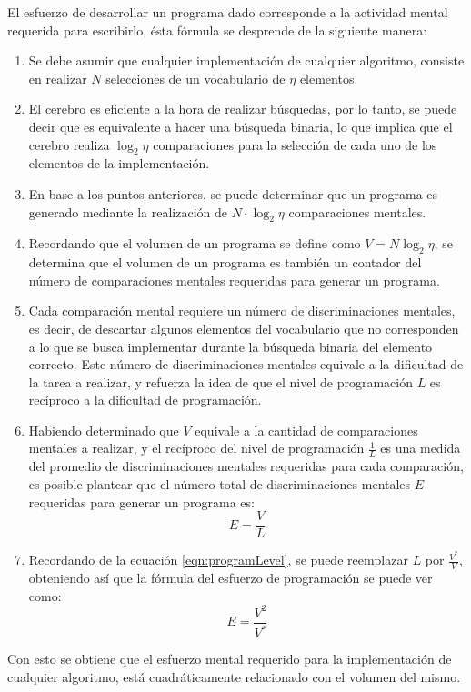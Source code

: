 \documentclass[letterpaper,12pt]{article}
\begin{document}
El esfuerzo de desarrollar un programa dado corresponde a la actividad mental requerida para escribirlo, ésta fórmula se desprende de la siguiente manera:

\begin{enumerate}
  \item Se debe asumir que cualquier implementación de cualquier algoritmo, consiste en realizar $N$ selecciones de un vocabulario de $\eta$ elementos.
  \item El cerebro es eficiente a la hora de realizar búsquedas, por lo tanto, se puede decir que es equivalente a hacer una búsqueda binaria, lo que implica que el cerebro realiza $\log_{2}\eta$ comparaciones para la selección de cada uno de los elementos de la implementación.
  \item En base a los puntos anteriores, se puede determinar que un programa es generado mediante la realización de $N \cdot \log_{2}\eta$ comparaciones mentales.
  \item Recordando que el volumen de un programa se define como $V = N\log_{2}\eta$, se determina que el volumen de un programa es también un contador del número de comparaciones mentales requeridas para generar un programa.
  \item Cada comparación mental requiere un número de discriminaciones mentales, es decir, de descartar algunos elementos del vocabulario que no corresponden a lo que se busca implementar durante la búsqueda binaria del elemento correcto. Este número de discriminaciones mentales equivale a la dificultad de la tarea a realizar, y refuerza la idea de que el nivel de programación $L$ es recíproco a la dificultad de programación.
  \item Habiendo determinado que $V$ equivale a la cantidad de comparaciones mentales a realizar, y el recíproco del nivel de programación $\frac{1}{L}$ es una medida del promedio de discriminaciones mentales requeridas para cada comparación, es posible plantear que el número total de discriminaciones mentales $E$ requeridas para generar un programa es:
        \begin{equation}
          E = \frac{V}{L}
        \end{equation}
  \item Recordando de la ecuación \ref{eqn:programLevel}, se puede reemplazar $L$ por $\frac{V^{*}}{V}$, obteniendo así que la fórmula del esfuerzo de programación se puede ver como:
        \begin{equation}
          \label{eqn:programEffort}
          E = \frac{V^{2}}{V^{*}}
        \end{equation}
\end{enumerate}
Con esto se obtiene que el esfuerzo mental requerido para la implementación de cualquier algoritmo, está cuadráticamente relacionado con el volumen del mismo.
\end{document}
